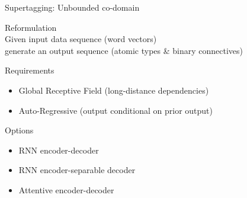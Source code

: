 \documentclass{beamer}
\begin{document}
\begin{frame}{Supertagging: Unbounded co-domain}

	\alert{Reformulation}\\
	\quad Given input data sequence (word vectors) \\
	\quad generate an output sequence (atomic types \& binary connectives)
	\vfill

	\pause
	\alert{Requirements}
	\begin{itemize}
		\item Global Receptive Field (long-distance dependencies)
		\item Auto-Regressive (output conditional on prior output)	
	\end{itemize}
	
	\alert{Options}
	\begin{itemize}
		\item RNN encoder-decoder \pause \frownie \pause
		\item RNN encoder-separable decoder \pause \frownie \pause
		\item Attentive encoder-decoder \pause \smiley
	\end{itemize}
\end{frame}
\end{document}
